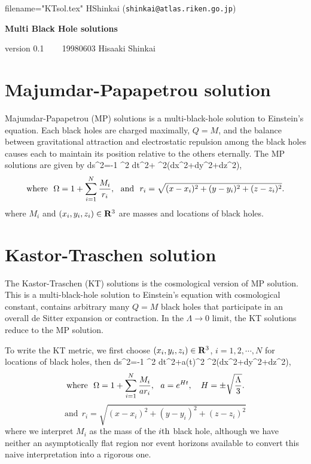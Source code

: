 \def\pl{ \partial}
\def\half{{1 \over 2}}

\noindent
filename="KTsol.tex" HShinkai ({\tt shinkai@atlas.riken.go.jp})

\begin{center}

{\Large\bf Multi Black Hole solutions}

\end{center}
\begin{flushright}
version 0.1 ~~~
19980603 Hisaaki Shinkai
\end{flushright}

\section{Majumdar-Papapetrou solution}
Majumdar-Papapetrou (MP)
solutions\cite{MP} is a multi-black-hole solution to Einstein's
equation.
Each black holes are charged maximally, $Q=M$,  and
the balance between gravitational attraction and
electrostatic repulsion among the black holes causes each to maintain
its position relative to the others eternally.
The MP solutions are given by
\be
ds^2=-{1 \over \Omega^2} dt^2+ \Omega^2(dx^2+dy^2+dz^2),
\label{MPmetric}
\en
$$\mbox{where}~~
\Omega=1+\sum_{i=1}^N {M_i \over  r_i},~~ \mbox{and}~~
  r_i=\sqrt{(x-x_i)^2+(y-y_i)^2+(z-z_i)^2}.
$$
where $M_i$ and $(x_i, y_i, z_i) \in {\bf R}^3$ are masses and
locations of black holes.


\section{Kastor-Traschen solution}


The  Kastor-Traschen (KT) solutions \cite{KT} is the cosmological
version of MP solution.  This is a multi-black-hole solution
  to Einstein's
equation with cosmological constant,  contains arbitrary many
$Q=M$ black holes that participate in an overall de Sitter expansion
or contraction.  In the $\Lambda \rightarrow 0$
limit, the KT solutions reduce to the MP solution.
 
To write the KT
metric, we first choose $(x_i, y_i, z_i) \in {\bf R}^3$,
$i=1,2,\cdots,N$ for locations of black holes, then
\be
ds^2=-{1 \over \Omega^2} dt^2+a(t)^2 \Omega^2(dx^2+dy^2+dz^2),
\label{KTmetric}
\en
$$\mbox{where}~~
\Omega=1+\sum_{i=1}^N {M_i \over a r_i},~~ a=e^{Ht}, ~~~
H=\pm \sqrt{\Lambda \over 3}.$$
$$\mbox{and}~~ r_i=\sqrt{(x-x_i)^2+(y-y_i)^2+(z-z_i)^2}$$
where we interpret $M_i$
as the mass of the $i{\rm th}$ black hole, although we have
neither an asymptotically flat region nor event horizons available
to convert this naive interpretation into a rigorous one.

